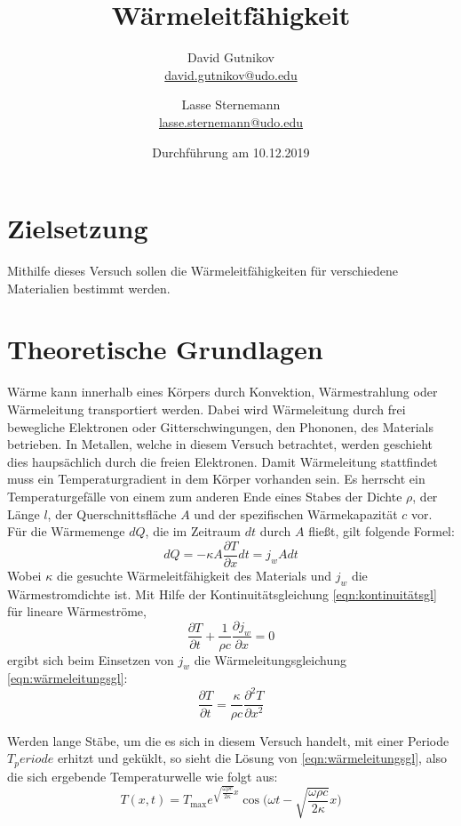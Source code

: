 \documentclass[titlepage = firstcover]{scrartcl}
\title{Wärmeleitfähigkeit}
\author{
  David Gutnikov\\
  \href{mailto:david.gutnikov@udo.edu}{david.gutnikov@udo.edu}
 \and 
  Lasse Sternemann\\
  \href{mailto:lasse.sternemann@udo.edu}{lasse.sternemann@udo.edu}
}
\date{Durchführung am 10.12.2019}
\begin{document}
  \maketitle
  \newpage
  \tableofcontents
  \newpage

  \section{Zielsetzung}
    Mithilfe dieses Versuch sollen die Wärmeleitfähigkeiten für verschiedene Materialien bestimmt werden.

  \section{Theoretische Grundlagen}
    Wärme kann innerhalb eines Körpers durch Konvektion, Wärmestrahlung oder Wärmeleitung transportiert werden.
    Dabei wird Wärmeleitung durch frei bewegliche Elektronen oder Gitterschwingungen, den Phononen, des Materials betrieben.
    In Metallen, welche in diesem Versuch betrachtet, werden geschieht dies haupsächlich durch die freien Elektronen.
    Damit Wärmeleitung stattfindet muss ein Temperaturgradient in dem Körper vorhanden sein.
    Es herrscht ein Temperaturgefälle von einem zum anderen Ende eines Stabes der Dichte $\rho$, der Länge $l$,
    der Querschnittsfläche $A$ und der spezifischen Wärmekapazität $c$ vor. Für die Wärmemenge $dQ$, die im Zeitraum $dt$
    durch $A$ fließt, gilt folgende Formel:
    \begin{equation}
      dQ = -\kappa A \frac{\partial T}{\partial x} dt = j_w A dt
      \label{eqn:dQ}
    \end{equation}
    Wobei $\kappa$ die gesuchte Wärmeleitfähigkeit des Materials und $j_w$ die Wärmestromdichte ist.
    Mit Hilfe der Kontinuitätsgleichung \eqref{eqn:kontinuitätsgl} für lineare Wärmeströme,
    \begin{equation}
        \label{eqn:kontinuitätsgl}
      \frac{\partial T}{\partial t} + \frac{1}{\rho c} \frac{\partial j_w}{\partial x} = 0
    \end{equation}
    ergibt sich beim Einsetzen von $j_w$ die Wärmeleitungsgleichung \eqref{eqn:wärmeleitungsgl}:
    \begin{equation}
        \label{eqn:wärmeleitungsgl}
      \frac{\partial T}{\partial t} = \frac{\kappa}{\rho c} \frac{\partial^2 T}{\partial x^2}
    \end{equation}
    
    \noindent
    Werden lange Stäbe, um die es sich in diesem Versuch handelt, mit einer Periode $T_periode$ erhitzt und geküklt,
    so sieht die Lösung von \eqref{eqn:wärmeleitungsgl}, also die sich ergebende Temperaturwelle wie folgt aus:
    \begin{equation}
      T(x, t) = T_{\text{max}} e^{\sqrt{\frac{\omega \rho c}{2 \kappa}}x} \cos \biggl(\omega t - \sqrt{\frac{\omega \rho c}{2 \kappa}}x \biggr)
    \end{equation}
    \newpage
\end{document}
